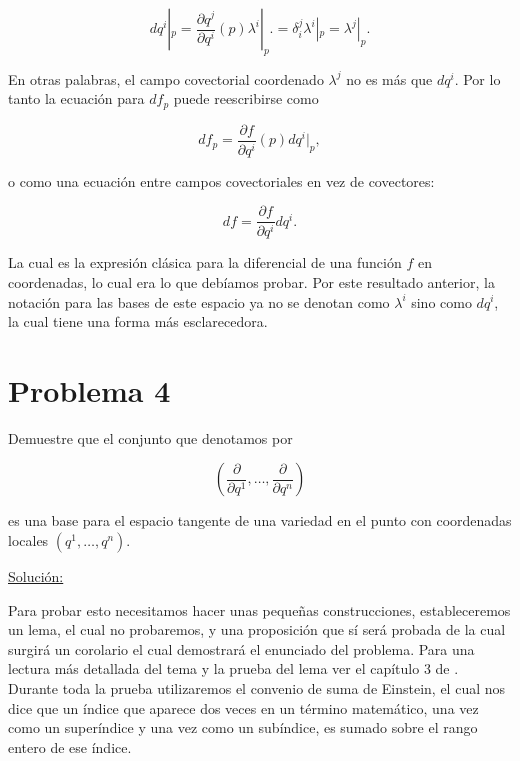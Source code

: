 \documentclass[a4paper,10pt]{article}
\numberwithin{equation}{section}
\begin{document}
\begin{equation}
 dq^i|_p = \frac{\partial q^j}{\partial q^i}(p) \lambda^i|_p. = 
 \delta^j_i \lambda^i|_p = \lambda^j|_p.
\end{equation}

En otras palabras, el campo covectorial coordenado $\lambda^j$ no es más que 
$dq^i$. Por lo tanto la ecuación  para $df_p$ puede 
reescribirse como 

\begin{equation}
 df_p = \frac{\partial f}{\partial q^i}(p) dq^i|_p,
\end{equation}

o como una ecuación entre campos covectoriales en vez de covectores: 

\begin{equation}
 df = \frac{\partial f}{\partial q^i}dq^i.
\end{equation}

La cual es la expresión clásica para la diferencial de una función $f$ en coordenadas, 
lo cual era lo que debíamos probar. Por este resultado anterior, la notación para 
las bases de este espacio ya no se denotan como $\lambda^i$ sino como $dq^i$, la cual 
tiene una forma más esclarecedora.


\section{Problema 4}

Demuestre que el conjunto que denotamos por 

$$
\left( \frac{\partial}{\partial q^1},\dots, \frac{\partial}{\partial q^n}\right)
$$

es una base para el espacio tangente de una variedad en el punto con coordenadas 
locales $(q^1,\dots,q^n)$.

\vspace{.3cm}

\underline{Solución:} \vspace{.3cm}

Para probar esto necesitamos hacer unas pequeñas construcciones, estableceremos un 
lema, el cual no probaremos, y una proposición que sí será probada de la cual 
surgirá un corolario el cual demostrará el enunciado del problema. Para una lectura 
más detallada del tema y la prueba del lema ver el capítulo 3 de \cite{lee}. Durante 
toda la prueba utilizaremos el convenio de suma de Einstein, el cual nos dice 
que un índice que aparece dos veces en un término matemático, una vez como un 
superíndice y una vez como un subíndice, es sumado sobre el rango entero de ese 
índice. 
\end{document}
